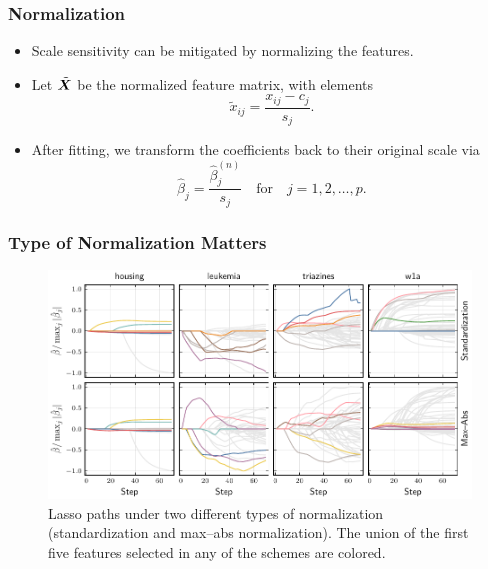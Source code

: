 \documentclass[10pt]{beamer}
\begin{document}
\begin{frame}[c]
  \frametitle{Normalization}

  \begin{itemize}[<+->]
    \item Scale sensitivity can be mitigated by normalizing the features.
    \item Let \(\tilde{\bm{X}}\) be the normalized feature matrix, with elements
          \[
            \tilde{x}_{ij} = \frac{x_{ij} - c_{j}}{s_j}.
          \]
    \item After fitting, we transform the coefficients back to their original scale via
          \[
            \hat\beta_j = \frac{\hat\beta^{(n)}_j}{s_j} \quad\text{for}\quad j = 1,2,\dots,p.
          \]
  \end{itemize}

\end{frame}

\begin{frame}[c]
  \frametitle{Type of Normalization Matters}

  \begin{figure}[htpb]
    \centering
    \includegraphics[width=\textwidth]{images/paper6-realdata_paths.pdf}
    \caption{%
      Lasso paths under two different types of normalization (standardization and max--abs normalization). The union of the first five features selected in any of the schemes are colored.
    }
  \end{figure}

\end{frame}
\end{document}
